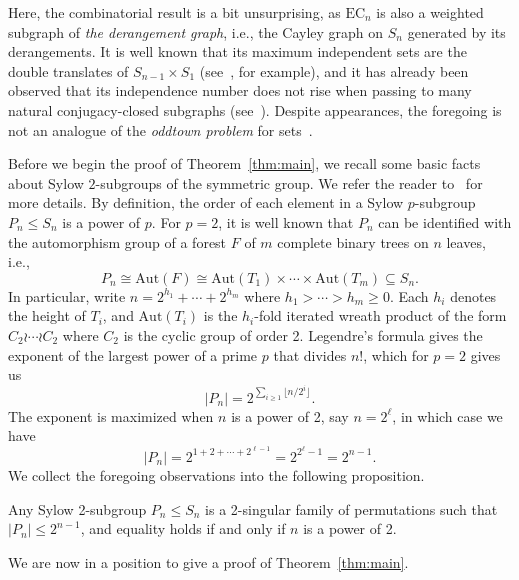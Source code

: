 \documentclass[12pt]{article}
\begin{document}
\noindent Here, the combinatorial result is a bit unsurprising, as $\mathrm{EC}_n$ is also a weighted subgraph of \emph{the derangement graph}, i.e., the Cayley graph on $S_n$ generated by its derangements. It is well known that its maximum independent sets are the double translates of $S_{n-1} \times S_1$ (see~\cite{GodsilMeagher}, for example), and it has already been observed that its independence number does not rise when passing to many natural conjugacy-closed subgraphs (see~\cite{KuLW16,FilmusL24}). Despite appearances, the foregoing is not an analogue of the \emph{oddtown problem} for sets~\cite{BF92}.

\medskip

Before we begin the proof of Theorem~\ref{thm:main}, we recall some basic facts about Sylow $2$-subgroups of the symmetric group. We refer the reader to~\cite{Renteln25,WildonBlog2} for more details.
By definition, the order of each element in a Sylow $p$-subgroup $P_n \leq S_n$ is a power of $p$. For $p=2$, it is well known that $P_n$ can be identified with the automorphism group of a forest $F$ of $m$ complete binary trees on $n$ leaves, i.e., 
$$P_n \cong \mathrm{Aut}(F) \cong \mathrm{Aut}(T_1) \times \cdots \times \mathrm{Aut}(T_m) \subseteq S_n.$$ 
In particular, write $n = 2^{h_1} + \cdots + 2^{h_m}$ where $h_1 > \cdots  > h_m \geq 0$. Each $h_i$ denotes the height of $T_i$, and $\mathrm{Aut}(T_i)$ is the $h_i$-fold iterated wreath product of the form $C_2 \wr \cdots \wr C_2$ where $C_2$ is the cyclic group of order 2. Legendre's formula gives the exponent of the largest power of a prime $p$ that divides $n!$, which for $p=2$ gives us 
$$|P_n| = 2^{\sum_{i \ge 1} \lfloor n/2^i \rfloor}.$$ 
The exponent is maximized when $n$ is a power of 2, say $n=2^\ell$, in which case we have 
$$|P_n| = 2^{1 + 2 + \cdots + 2^{\ell-1}} =  2^{2^\ell - 1} =  2^{n - 1}.$$
We collect the foregoing observations into the following proposition.
\begin{proposition}\label{prop:sylow}
Any Sylow 2-subgroup $P_n \leq S_n$ is a 2-singular family of permutations such that $|P_n| \leq 2^{n-1}$, and equality holds if and only if $n$ is a power of 2. 
\end{proposition}
\noindent We are now in a position to give a proof of Theorem~\ref{thm:main}.
\end{document}
